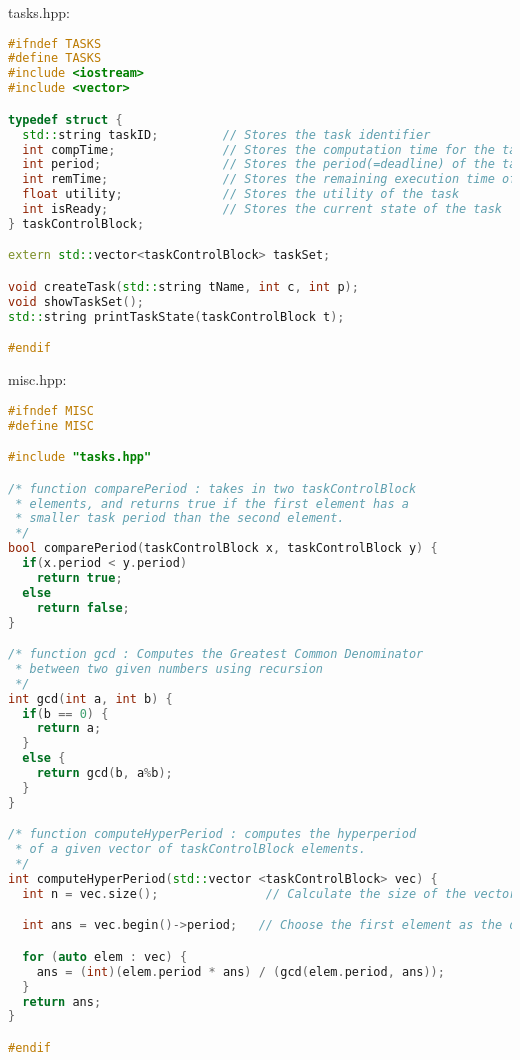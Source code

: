 tasks.hpp:
\begin{lstlisting}[language=C++, frame=single]
#ifndef TASKS
#define TASKS
#include <iostream>
#include <vector>

typedef struct {
  std::string taskID;         // Stores the task identifier
  int compTime;               // Stores the computation time for the task
  int period;                 // Stores the period(=deadline) of the task
  int remTime;                // Stores the remaining execution time of the task
  float utility;              // Stores the utility of the task
  int isReady;                // Stores the current state of the task
} taskControlBlock;

extern std::vector<taskControlBlock> taskSet;

void createTask(std::string tName, int c, int p);
void showTaskSet();
std::string printTaskState(taskControlBlock t);

#endif
\end{lstlisting}

misc.hpp:
\begin{lstlisting}[language=C++, frame=single]
#ifndef MISC
#define MISC

#include "tasks.hpp"

/* function comparePeriod : takes in two taskControlBlock
 * elements, and returns true if the first element has a
 * smaller task period than the second element.
 */
bool comparePeriod(taskControlBlock x, taskControlBlock y) {
  if(x.period < y.period)
    return true;
  else
    return false;
}

/* function gcd : Computes the Greatest Common Denominator
 * between two given numbers using recursion
 */
int gcd(int a, int b) {
  if(b == 0) {
    return a;
  }
  else {
    return gcd(b, a%b);
  }
}

/* function computeHyperPeriod : computes the hyperperiod
 * of a given vector of taskControlBlock elements.
 */
int computeHyperPeriod(std::vector <taskControlBlock> vec) {
  int n = vec.size();               // Calculate the size of the vector

  int ans = vec.begin()->period;   // Choose the first element as the default answer

  for (auto elem : vec) {
    ans = (int)(elem.period * ans) / (gcd(elem.period, ans));
  }
  return ans;
}

#endif
\end{lstlisting}

